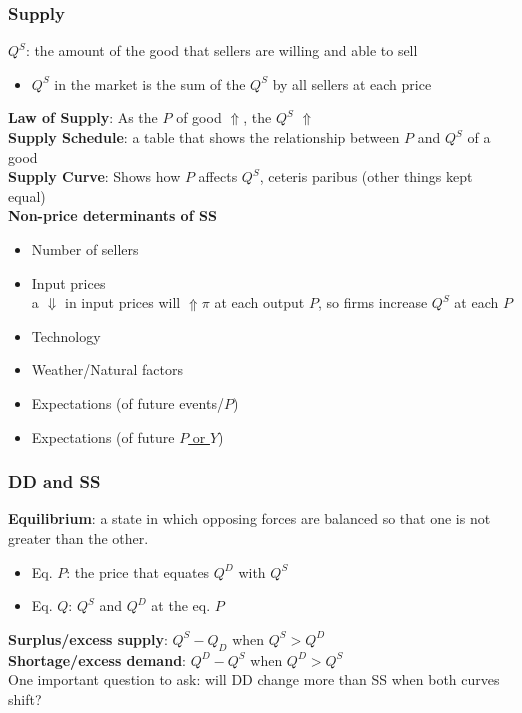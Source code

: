 \documentclass{article}
\begin{document}
\begin{multicols}{2}
\subsubsection{Supply}
$Q^S$: the amount of the good that sellers are willing and able to sell
\begin{itemize}
	\item $Q^S$ in the market is the sum of the $Q^S$ by all sellers at each price\\
\end{itemize}
\textbf{Law of Supply}: As the $P$ of good $\Uparrow$, the $Q^S$ $\Uparrow$\\
\textbf{Supply Schedule}: a table that shows the relationship between $P$ and $Q^S$ of a good\\
\textbf{Supply Curve}: Shows how $P$ affects $Q^S$, ceteris paribus (other things kept equal)\\

\textbf{Non-price determinants of SS}
\begin{itemize}
	\item Number of sellers
	\item Input prices\\
	a $\Downarrow$ in input prices will $\Uparrow\pi$ at each output $P$, so firms increase $Q^S$ at each $P$
	\item Technology
	\item Weather/Natural factors
	\item Expectations (of future events/$P$)
	\item Expectations (of future \underline{$P$ or $Y$})
\end{itemize}

\subsubsection{DD and SS}
\textbf{Equilibrium}: a state in which opposing forces are balanced so that one is not greater than the other.
\begin{itemize}
	\item Eq. $P$: the price that equates $Q^D$ with $Q^S$
	\item Eq. $Q$: $Q^S$ and $Q^D$ at the eq. $P$
\end{itemize}
\textbf{Surplus/excess supply}: $Q^S -  Q_D$ when $Q^S >  Q^D$\\
\textbf{Shortage/excess demand}: $Q^D -  Q^S$ when $Q^D > Q^S$\\

One important question to ask: will DD change more than SS when both curves shift?


\end{multicols}
\end{document}

